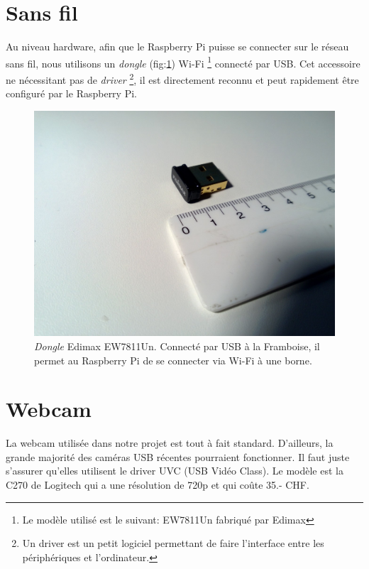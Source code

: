 \documentclass[a4paper,11pt]{report}
\begin{document}
{\section{Sans fil}

Au niveau hardware, afin que le Raspberry Pi puisse se connecter sur le réseau
sans fil, nous utilisons un \textit{dongle} (fig:\ref{Edimax})
Wi-Fi \footnote{Le modèle utilisé est le suivant: EW7811Un fabriqué par
  Edimax} connecté par USB. Cet accessoire ne nécessitant pas de \textit{driver} \footnote{Un
  driver est un petit logiciel permettant de faire l'interface entre les
  périphériques et l'ordinateur.}, il est directement reconnu et peut rapidement être configuré par le Raspberry Pi. 
\begin{figure}[!h]
\begin{center}
\includegraphics[scale=0.38, trim=300 300 300 0, clip=true]{Edimax}
\caption[\textit{Dongle} Edimax EW7811Un]{\textit{Dongle} Edimax EW7811Un. Connecté par USB à la Framboise, il permet au Raspberry Pi de se connecter via Wi-Fi à une borne\label{Edimax}.}
\end{center}
\end{figure} 

\section{Webcam}

La webcam utilisée dans notre projet est tout à fait standard. D'ailleurs, la grande majorité des caméras USB récentes pourraient fonctionner. Il faut juste s'assurer qu'elles utilisent le driver UVC (USB Vidéo Class)\cite{uvc}. Le modèle est la C270 de Logitech qui a une résolution de 720p et qui coûte 35.- CHF.

}
\end{document}
